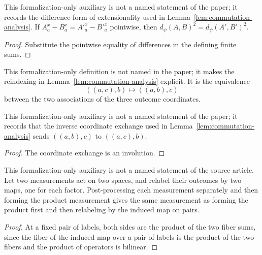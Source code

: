 \begin{lemma}
	\label{lem:distance-congr-sub}
	\leanok
	This formalization-only auxiliary is not a named statement of the paper; it
	records the difference form of extensionality used in
	Lemma~\ref{lem:commutation-analysis}. If $A^x_a-B^x_a=A'^x_a-B'^x_a$
	pointwise, then $d_\psi(A,B)^2=d_\psi(A',B')^2$.
\end{lemma}
\begin{proof}
	\leanok
	Substitute the pointwise equality of differences in the defining finite
	sums.
\end{proof}

\begin{definition}
	\label{def:distance-swap-last}
	\leanok
	This formalization-only definition is not named in the paper; it makes the
	reindexing in Lemma~\ref{lem:commutation-analysis} explicit. It is the
	equivalence
	\[
		((a,c),b)\longmapsto((a,b),c)
	\]
	between the two associations of the three outcome coordinates.
\end{definition}

\begin{lemma}
	\label{lem:distance-swap-last-inverse}
	\leanok
	This formalization-only auxiliary is not a named statement of the paper; it
	records that the inverse coordinate exchange used in
	Lemma~\ref{lem:commutation-analysis} sends $((a,b),c)$ to $((a,c),b)$.
\end{lemma}
\begin{proof}
	\leanok
	The coordinate exchange is an involution.
\end{proof}

	\begin{lemma}
		\label{lem:qld-tensor-measurement-postprocess}
		\leanok
		This formalization-only auxiliary is not a named statement of the source
		article. Let two measurements act on two spaces, and relabel their outcomes
		by two maps, one for each factor. Post-processing each measurement
		separately and then forming the product measurement gives the same
		measurement as forming the product first and then relabeling by the induced
		map on pairs.
	\end{lemma}
	\begin{proof}
		\leanok
		At a fixed pair of labels, both sides are the product of the two fiber
		sums, since the fiber of the induced map over a pair of labels is the
		product of the two fibers and the product of operators is bilinear.
	\end{proof}

